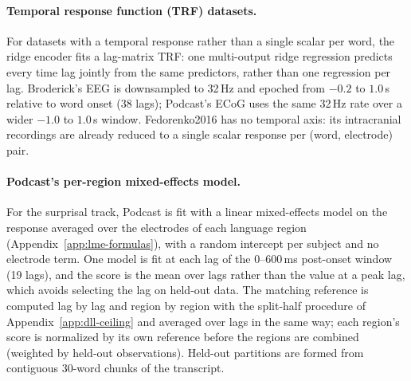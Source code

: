 

\paragraph{Temporal response function (TRF) datasets.} For datasets with a temporal response rather than a single scalar per word, the ridge encoder fits a lag-matrix TRF: one multi-output ridge regression predicts every time lag jointly from the same predictors, rather than one regression per lag. Broderick's EEG is downsampled to 32\,Hz and epoched from $-0.2$ to $1.0$\,s relative to word onset (38 lags); Podcast's ECoG uses the same 32\,Hz rate over a wider $-1.0$ to $1.0$\,s window. Fedorenko2016 has no temporal axis: its intracranial recordings are already reduced to a single scalar response per (word, electrode) pair.

\paragraph{Podcast's per-region mixed-effects model.} For the surprisal track, Podcast is fit with a linear mixed-effects model on the response averaged over the electrodes of each language region (Appendix~\ref{app:lme-formulas}), with a random intercept per subject and no electrode term. One model is fit at each lag of the 0--600\,ms post-onset window (19 lags), and the score is the mean over lags rather than the value at a peak lag, which avoids selecting the lag on held-out data. The matching reference is computed lag by lag and region by region with the split-half procedure of Appendix~\ref{app:dll-ceiling} and averaged over lags in the same way; each region's score is normalized by its own reference before the regions are combined (weighted by held-out observations). Held-out partitions are formed from contiguous 30-word chunks of the transcript.

